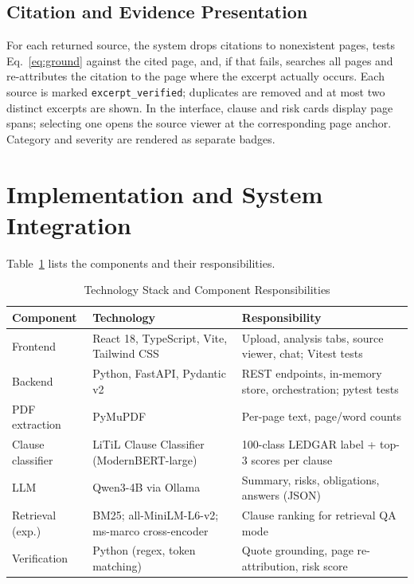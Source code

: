 \documentclass[conference]{IEEEtran}
\begin{document}
\subsection{Citation and Evidence Presentation}
For each returned source, the system drops citations to nonexistent pages, tests Eq.~\eqref{eq:ground} against the cited page, and, if that fails, searches all pages and re-attributes the citation to the page where the excerpt actually occurs. Each source is marked \texttt{excerpt\_verified}; duplicates are removed and at most two distinct excerpts are shown. In the interface, clause and risk cards display page spans; selecting one opens the source viewer at the corresponding page anchor. Category and severity are rendered as separate badges.

\section{Implementation and System Integration}
Table~\ref{tab:stack} lists the components and their responsibilities.

\begin{table}[t]
\caption{Technology Stack and Component Responsibilities}
\label{tab:stack}
\centering
\footnotesize
\setlength{\tabcolsep}{3pt}
\begin{tabular}{@{}>{\raggedright}p{2.0cm}>{\raggedright}p{2.3cm}p{3.9cm}@{}}
\toprule
\textbf{Component} & \textbf{Technology} & \textbf{Responsibility} \\
\midrule
Frontend & React 18, TypeScript, Vite, Tailwind CSS & Upload, analysis tabs, source viewer, chat; Vitest tests \\
Backend & Python, FastAPI, Pydantic v2 & REST endpoints, in-memory store, orchestration; pytest tests \\
PDF extraction & PyMuPDF & Per-page text, page/word counts \\
Clause classifier & LiTiL Clause Classifier (ModernBERT-large) & 100-class LEDGAR label + top-3 scores per clause \\
LLM & Qwen3-4B \cite{qwen2025} via Ollama & Summary, risks, obligations, answers (JSON) \\
Retrieval (exp.) & BM25; all-MiniLM-L6-v2; ms-marco cross-encoder & Clause ranking for retrieval QA mode \\
Verification & Python (regex, token matching) & Quote grounding, page re-attribution, risk score \\
\bottomrule
\end{tabular}
\end{table}
\end{document}

